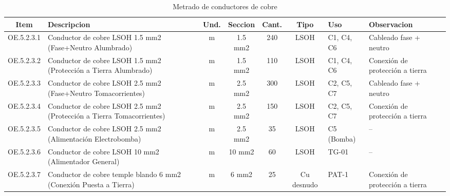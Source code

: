 \begin{table}[H]
\centering
\small
\setlength{\tabcolsep}{4pt}
\caption{Metrado de conductores de cobre}
\label{tab:metrado-conductores}
\begin{tabularx}{\textwidth}{c L{3.5cm} c c c c L{1.8cm} Y}
\toprule
\textbf{Item} & \textbf{Descripcion} & \textbf{Und.} & \textbf{Seccion} & \textbf{Cant.} & \textbf{Tipo} & \textbf{Uso} & \textbf{Observacion} \\
\midrule
OE.5.2.3.1 & Conductor de cobre LSOH 1.5 mm2 (Fase+Neutro Alumbrado) & m & 1.5 mm2 & 240 & LSOH & C1, C4, C6 & Cableado fase + neutro \\
OE.5.2.3.2 & Conductor de cobre LSOH 1.5 mm2 (Protección a Tierra Alumbrado) & m & 1.5 mm2 & 110 & LSOH & C1, C4, C6 & Conexión de protección a tierra \\
OE.5.2.3.3 & Conductor de cobre LSOH 2.5 mm2 (Fase+Neutro Tomacorrientes) & m & 2.5 mm2 & 300 & LSOH & C2, C5, C7 & Cableado fase + neutro \\
OE.5.2.3.4 & Conductor de cobre LSOH 2.5 mm2 (Protección a Tierra Tomacorrientes) & m & 2.5 mm2 & 150 & LSOH & C2, C5, C7 & Conexión de protección a tierra \\
OE.5.2.3.5 & Conductor de cobre LSOH 2.5 mm2 (Alimentación Electrobomba) & m & 2.5 mm2 & 35 & LSOH & C5 (Bomba) & -- \\
OE.5.2.3.6 & Conductor de cobre LSOH 10 mm2 (Alimentador General) & m & 10 mm2 & 60 & LSOH & TG-01 & -- \\
OE.5.2.3.7 & Conductor de cobre temple blando 6 mm2 (Conexión Puesta a Tierra) & m & 6 mm2 & 25 & Cu desnudo & PAT-1 & Conexión de protección a tierra \\
\bottomrule
\end{tabularx}
\end{table}

